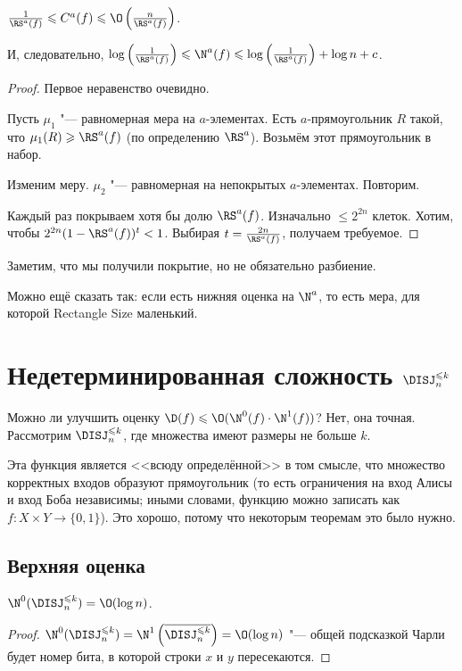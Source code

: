 \begin{theorem} 
$\frac{1}{\RS^a(f)}\leqslant C^a(f) \leqslant \O\left(\frac{n}{\RS^a(f)}\right)$.

И, следовательно,
$\log\left(\frac{1}{\RS^a(f)}\right)\leqslant \N^a(f) \leqslant \log\left(\frac{1}{\RS^a(f)}\right) + \log n + c$.
\end{theorem}
\begin{proof}
Первое неравенство очевидно.

Пусть $\mu_1$ "--- равномерная мера на $a$-элементах.
Есть $a$-прямоугольник $R$ такой, что $\mu_1(R)\geqslant \RS^a(f)$ (по определению $\RS^a$). Возьмём этот прямоугольник в набор.

Изменим меру. $\mu_2$ "--- равномерная на непокрытых $a$-элементах. Повторим.

Каждый раз покрываем хотя бы долю $\RS^a(f)$. Изначально $\leqslant 2^{2n}$ клеток. Хотим, чтобы $2^{2n}(1-\RS^a(f))^t < 1$.
Выбирая $t = \frac{2n}{\RS^a(f)}$, получаем требуемое.
\end{proof}

Заметим, что мы получили покрытие, но не обязательно разбиение.

Можно ещё сказать так: если есть нижняя оценка на $\N^a$, то есть мера, для которой Rectangle Size маленький.

\section{Недетерминированная сложность \texorpdfstring{$\DISJ^{\leqslant k}_n$}{DISJ(n, <=k)}}

Можно ли улучшить оценку $\D(f) \leqslant \O(\N^0(f)\cdot \N^1(f))$? Нет, она точная.
Рассмотрим $\DISJ^{\leqslant k}_n$, где множества имеют размеры не больше $k$.

Эта функция является <<всюду определённой>> в том смысле, что множество корректных входов образуют прямоугольник (то есть ограничения на вход Алисы и вход Боба независимы; иными словами, функцию можно записать как $f\colon X\times Y\to \{0, 1\}$). Это хорошо, потому что некоторым теоремам это было нужно.

\subsection{Верхняя оценка}

\begin{theorem}
$\N^0(\DISJ^{\leqslant k}_n) = \O(\log n)$.
\end{theorem}
\begin{proof}
$\N^0(\DISJ^{\leqslant k}_n) = \N^1\left(\overline{\DISJ^{\leqslant k}_n}\right) = \O(\log n)$ "--- общей подсказкой Чарли будет номер бита, в которой строки $x$ и $y$ пересекаются.
\end{proof}

